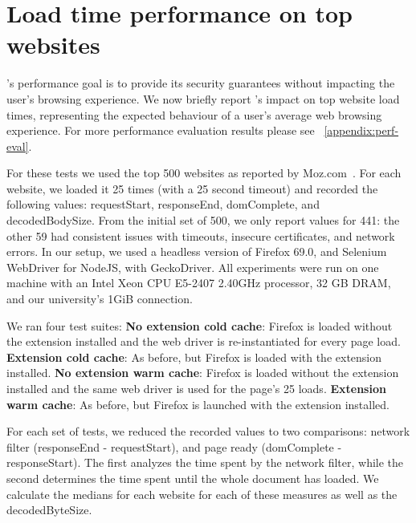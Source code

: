 \section{Load time performance on top websites} \label{performance}

\sys's performance goal is to provide its security guarantees without
impacting the user's browsing experience. We now briefly report \sys's
impact on top website load times, representing the expected behaviour
of a user's average web browsing experience. For more performance
evaluation results please see ~\autoref{appendix:perf-eval}.

% 
For these tests we used the top 500 websites as
reported by Moz.com~\cite{top500}. For each website, we loaded it 25
times (with a 25 second timeout) and recorded the following values:
requestStart, responseEnd, domComplete, and decodedBodySize. From the
initial set of 500, we only report values for 441: the other 59 had
consistent issues with timeouts, insecure certificates, and network
errors. In our setup, we used a headless version of Firefox 69.0, and
Selenium WebDriver for NodeJS, with GeckoDriver. All experiments were
run on one machine with an Intel Xeon CPU E5-2407 2.40GHz processor,
32 GB DRAM, and our university's 1GiB connection.

We ran four test suites:
\textbf{No extension cold cache}: Firefox is loaded without the extension installed and the web driver is re-instantiated for every page load.
\textbf{Extension cold cache}: As before, but Firefox is loaded with the extension installed.
\textbf{No extension warm cache}: Firefox is loaded without the extension installed and the same web driver is used for the page's 25 loads.
\textbf{Extension warm cache}: As before, but Firefox is launched with the extension installed.

For each set of tests, we reduced the recorded values to two comparisons: network filter (responseEnd - requestStart), and page ready (domComplete - responseStart). The first analyzes the time spent by the network filter, while the second determines the time spent until the whole document has loaded. We calculate the medians for each website for each of these measures as well as the decodedByteSize.

